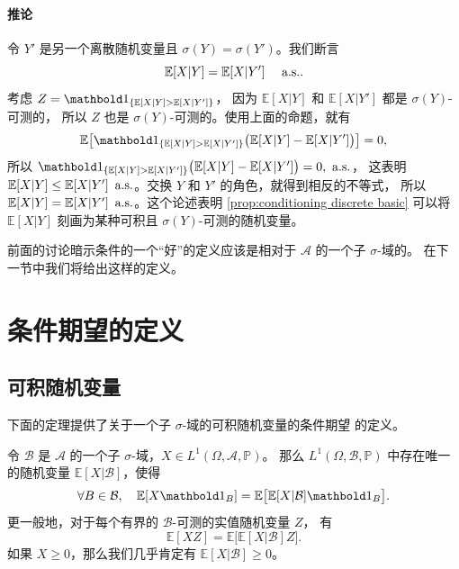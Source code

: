 \paragraph{推论}
令 $Y'$ 是另一个离散随机变量且 $\sigma(Y)=\sigma(Y')$。我们断言
\[
  \mathbb{E}[X|Y]=\mathbb{E}[X|Y']\quad \text{$$ a.s.}.
\]
考虑 $Z=\idf_{\{\mathbb{E}[X|Y]>\mathbb{E}[X|Y']\}}$，
因为 $\mathbb{E}[X|Y]$ 和 $\mathbb{E}[X|Y']$ 都是 $\sigma(Y)$-可测的，
所以 $Z$ 也是 $\sigma(Y)$-可测的。使用上面的命题，就有
\[
  \mathbb{E}\bigl[
    \idf_{\{\mathbb{E}[X|Y]>\mathbb{E}[X|Y']\}}
    \bigl(
      \mathbb{E}[X|Y]-\mathbb{E}[X|Y']
    \bigr)
  \bigr]=0,
\]
所以 $\idf_{\{\mathbb{E}[X|Y]>\mathbb{E}[X|Y']\}}\bigl(\mathbb{E}[X|Y]-\mathbb{E}[X|Y']\bigr)=0,\alsu{}$，
这表明 $\mathbb{E}[X|Y]\leq \mathbb{E}[X|Y']\, \text{$$ a.s.}$。交换 $Y$ 和 $Y'$ 的角色，就得到相反的不等式，
所以 $\mathbb{E}[X|Y]=\mathbb{E}[X|Y']\,\text{$$ a.s.}$。这个论述表明 \autoref{prop:conditioning discrete basic}
可以将 $\mathbb{E}[X|Y]$ 刻画为某种可积且 $\sigma(Y)$-可测的随机变量。

前面的讨论暗示条件的一个“好”的定义应该是相对于 $\mathcal{A}$ 的一个子 $\sigma$-域的。
在下一节中我们将给出这样的定义。


\section{条件期望的定义}

\subsection{可积随机变量}

下面的定理提供了关于一个子 $\sigma$-域的可积随机变量的条件期望
的定义。

\begin{theorem}\label{thm:conditioning variable}
  令 $\mathcal{B}$ 是 $\mathcal{A}$ 的一个子 $\sigma$-域，$X\in L^1(\Omega,\mathcal{A},\mathbb{P})$。
  那么 $L^1(\Omega,\mathcal{B},\mathbb{P})$ 中存在唯一的随机变量
  $\mathbb{E}[X| \mathcal{B}]$，使得
  \begin{equation}\label{eq:conditioning variable}
    \forall B\in \mathcal{B},\quad
    \mathbb{E}[X \indicator{B}]=\mathbb{E}\bigl[\mathbb{E}[X| \mathcal{B}]\indicator{B}\bigr]  .
  \end{equation}
  更一般地，对于每个有界的 $\mathcal{B}$-可测的实值随机变量 $Z$，
  有
  \begin{equation}\label{eq:conditioning variable general}
        \mathbb{E}[XZ]=\mathbb{E}\bigl[\mathbb{E}[X| \mathcal{B}]Z\bigr]  .
  \end{equation}
  如果 $X\geq 0$，那么我们几乎肯定有 $\mathbb{E}[X| \mathcal{B}]\geq 0$。
\end{theorem}


